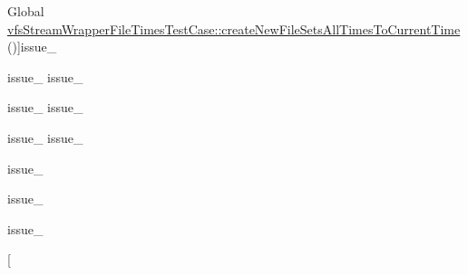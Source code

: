 \begin{DoxyRefList}
%
Global \mbox{\hyperlink{classorg_1_1bovigo_1_1vfs_1_1vfs_stream_wrapper_file_times_test_case_a6ae0093524893cc46a8ed6ea472450fe}{vfs\+Stream\+Wrapper\+File\+Times\+Test\+Case\+:\+:create\+New\+File\+Sets\+All\+Times\+To\+Current\+Time}} ()]issue\+\_  
\item[\label{test__test000206}%
\Hypertarget{test__test000206}%
Global \mbox{\hyperlink{classorg_1_1bovigo_1_1vfs_1_1vfs_stream_wrapper_file_times_test_case_a43b022baabad384907318fd21a215fe8}{vfs\+Stream\+Wrapper\+File\+Times\+Test\+Case\+:\+:file\+Get\+Contents\+Changes\+Attribute\+Time\+Only}} ()]issue\+\_  issue\+\_  
\item[\label{test__test000205}%
\Hypertarget{test__test000205}%
Global \mbox{\hyperlink{classorg_1_1bovigo_1_1vfs_1_1vfs_stream_wrapper_file_times_test_case_a74e1e838599473c45156ef4c68040ada}{vfs\+Stream\+Wrapper\+File\+Times\+Test\+Case\+:\+:open\+File\+Changes\+Attribute\+Time\+Only}} ()]issue\+\_  issue\+\_  
\item[\label{test__test000207}%
\Hypertarget{test__test000207}%
Global \mbox{\hyperlink{classorg_1_1bovigo_1_1vfs_1_1vfs_stream_wrapper_file_times_test_case_a4ef0cae52a59e47c9b0c6050c4f4b76c}{vfs\+Stream\+Wrapper\+File\+Times\+Test\+Case\+:\+:open\+File\+With\+Truncate\+Changes\+Attribute\+And\+Modification\+Time}} ()]issue\+\_  issue\+\_  
\item[\label{test__test000208}%
\Hypertarget{test__test000208}%
Global \mbox{\hyperlink{classorg_1_1bovigo_1_1vfs_1_1vfs_stream_wrapper_file_times_test_case_a9f08dcdac224a2f9642eb45173b16724}{vfs\+Stream\+Wrapper\+File\+Times\+Test\+Case\+:\+:read\+File\+Changes\+Access\+Time}} ()]issue\+\_  
\item[\label{test__test000214}%
\Hypertarget{test__test000214}%
Global \mbox{\hyperlink{classorg_1_1bovigo_1_1vfs_1_1vfs_stream_wrapper_file_times_test_case_a7ea83b99e3dd2edace1f11bca24ce676}{vfs\+Stream\+Wrapper\+File\+Times\+Test\+Case\+:\+:remove\+File\+Changes\+Attribute\+And\+Modification\+Time\+Of\+Containing\+Directory}} ()]issue\+\_  
\item[\label{test__test000215}%
\Hypertarget{test__test000215}%
Global \mbox{\hyperlink{classorg_1_1bovigo_1_1vfs_1_1vfs_stream_wrapper_file_times_test_case_af8690006ca531e4ead9213eca9532af7}{vfs\+Stream\+Wrapper\+File\+Times\+Test\+Case\+:\+:rename\+File\+Changes\+Attribute\+And\+Modification\+Time\+Of\+Affected\+Directories}} ()]issue\+\_  
\item[\label{test__test000216}%
%

\end{DoxyRefList}
